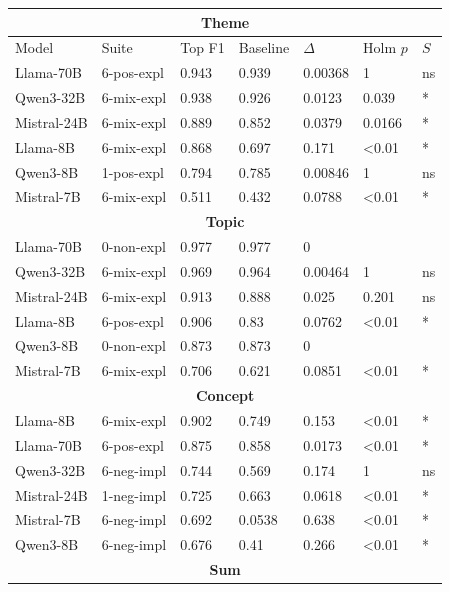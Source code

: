 \begin{table}
    \centering
    \scriptsize

    \begin{tabular}{ll|lllll}
    \toprule
    \multicolumn{7}{c}{\textbf{Theme}} \\
    \midrule
    Model & Suite & Top F1 & Baseline & $\Delta$ & Holm $p$ & $S$ \\
    \midrule
    Llama-70B & 6-pos-expl & 0.943 & 0.939 & 0.00368 & 1 & ns \\
    Qwen3-32B & 6-mix-expl & 0.938 & 0.926 & 0.0123 & 0.039 & * \\
    Mistral-24B & 6-mix-expl & 0.889 & 0.852 & 0.0379 & 0.0166 & * \\
    Llama-8B & 6-mix-expl & 0.868 & 0.697 & 0.171 & <0.01 & * \\
    Qwen3-8B & 1-pos-expl & 0.794 & 0.785 & 0.00846 & 1 & ns \\
    Mistral-7B & 6-mix-expl & 0.511 & 0.432 & 0.0788 & <0.01 & * \\
    \midrule
    \multicolumn{7}{c}{\textbf{Topic}} \\
    \midrule
    Llama-70B & 0-non-expl & 0.977 & 0.977 & 0 &  &  \\
    Qwen3-32B & 6-mix-expl & 0.969 & 0.964 & 0.00464 & 1 & ns \\
    Mistral-24B & 6-mix-expl & 0.913 & 0.888 & 0.025 & 0.201 & ns \\
    Llama-8B & 6-pos-expl & 0.906 & 0.83 & 0.0762 & <0.01 & * \\
    Qwen3-8B & 0-non-expl & 0.873 & 0.873 & 0 &  &  \\
    Mistral-7B & 6-mix-expl & 0.706 & 0.621 & 0.0851 & <0.01 & * \\
    \midrule
    \multicolumn{7}{c}{\textbf{Concept}} \\
    \midrule
    Llama-8B & 6-mix-expl & 0.902 & 0.749 & 0.153 & <0.01 & * \\
    Llama-70B & 6-pos-expl & 0.875 & 0.858 & 0.0173 & <0.01 & * \\
    Qwen3-32B & 6-neg-impl & 0.744 & 0.569 & 0.174 & 1 & ns \\
    Mistral-24B & 1-neg-impl & 0.725 & 0.663 & 0.0618 & <0.01 & * \\
    Mistral-7B & 6-neg-impl & 0.692 & 0.0538 & 0.638 & <0.01 & * \\
    Qwen3-8B & 6-neg-impl & 0.676 & 0.41 & 0.266 & <0.01 & * \\
    \midrule
    \multicolumn{7}{c}{\textbf{Sum}} \\

\end{tabular}
\end{table}
